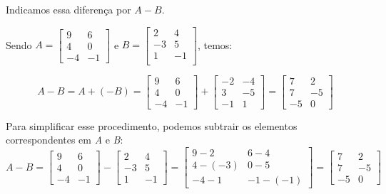   Indicamos essa diferença por $A - B$.
\begin{example}
  Sendo $A = \begin{bmatrix}
    9 & 6 \\
    4 & 0 \\
    -4 & -1
  \end{bmatrix}$ e $B = \begin{bmatrix}
    2 & 4 \\
    -3 & 5 \\
    1 & -1 \\
  \end{bmatrix}$, temos:
  
  \begin{equation*}
    A - B = A + (-B) = \begin{bmatrix}
      9 & 6 \\
      4 & 0 \\
      -4 & -1
    \end{bmatrix} + \begin{bmatrix}
      -2 & -4 \\
      3 & -5 \\
      -1 & 1
    \end{bmatrix} = \begin{bmatrix}
      7 & 2 \\
      7 & -5 \\
      -5 & 0
    \end{bmatrix} 
  \end{equation*}

  Para simplificar esse procedimento, podemos subtrair os elementos correspondentes em \textit{A} e \textit{B}:
  \begin{equation*}
    A - B = \begin{bmatrix}
      9 & 6 \\
      4 & 0 \\
      -4 & -1
    \end{bmatrix} - \begin{bmatrix}
      2 & 4 \\
      -3 & 5 \\
      1 & -1
    \end{bmatrix} = \begin{bmatrix}
      9 -2 & 6 - 4 \\
      4 - (-3) & 0 - 5 \\
      -4 -1 & -1 - (-1)
    \end{bmatrix} = \begin{bmatrix}
      7 & 2 \\
      7 & -5 \\
      -5 & 0
    \end{bmatrix}
  \end{equation*}
\end{example}

